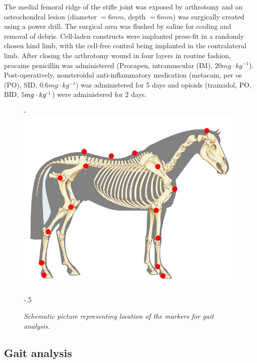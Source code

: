 \documentclass[twocolumn, empirical, authordate, issue]{jote-new-article}
\begin{document}
The medial femoral ridge of the stifle joint was exposed by arthrotomy and an osteochondral lesion (diameter $= 6 mm$, depth $= 6 mm$) was surgically created using a power drill. The surgical area was flushed by saline for cooling and removal of debris. Cell-laden constructs were implanted press-fit in a randomly chosen hind limb, with the cell-free control being implanted in the contralateral limb. After closing the arthrotomy wound in four layers in routine fashion, procaine penicillin was administered (Procapen, intramuscular (IM), $ 20 mg\cdot kg^{-1} $). Post-operatively, nonsteroidal anti-inflammatory medication (metacam, per os (PO), SID, $ 0.6 mg\cdot kg^{-1} $) was administered for 5 days and opioids (tramadol, PO, BID, $5 mg\cdot kg\textsuperscript{-1}$) were administered for $2$ days.

\begin{figure}[b!]
\captionsetup{width=\dimexpr \linewidth + \fullwidthlen\relax}
\begin{adjustwidth}{-\fullwidthlen}{}
\includegraphics[width=.95\linewidth]{media/image3.png}
\end{adjustwidth}
\begin{adjustwidth}{-.5\fullwidthlen}{}
\caption{\emph{Schematic picture representing location of the markers for gait analysis.}}
\label{fig:figure3}
\end{adjustwidth} 
\end{figure}
\subsection{Gait analysis} 
\end{document}
